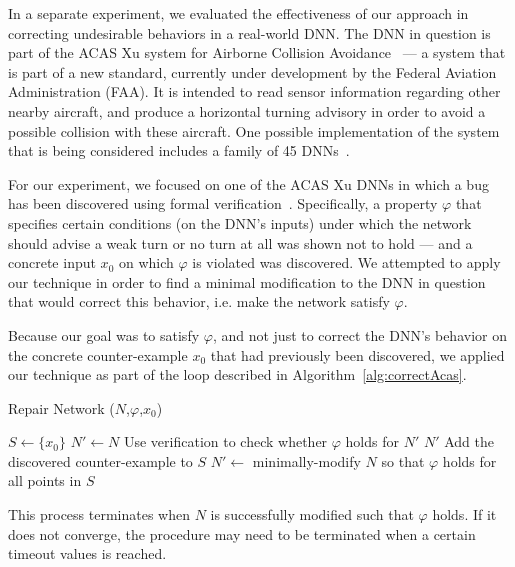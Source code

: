\documentclass{easychair}
\begin{document}
In a separate experiment, we evaluated the effectiveness of our
approach in correcting undesirable behaviors in a real-world DNN. The
DNN in question is part of the ACAS Xu system for Airborne Collision
Avoidance~\cite{JuLoBrOwKo16} --- a system that is part of a new
standard, currently under development by the Federal Aviation
Administration (FAA). It is intended to
read sensor information regarding other nearby aircraft, and produce a
horizontal turning advisory in order to avoid a possible collision
with these aircraft. One possible implementation of the system that is
being considered includes a family of 45 DNNs~\cite{JuLoBrOwKo16}.

For our experiment, we focused on one of the ACAS Xu DNNs in which a
bug has been discovered using formal
verification~\cite{KaBaDiJuKo17Reluplex}. Specifically, a property
$\varphi$ that specifies certain conditions (on the DNN's inputs)
under which the network should advise a weak turn or no turn at all
was shown not to hold --- and a concrete input $x_0$ on which $\varphi$ is
violated was discovered. We attempted to apply our
technique in order to find a minimal modification to the DNN in question that
would correct this behavior, i.e. make the network satisfy $\varphi$.

Because our goal was to satisfy $\varphi$, and not just to correct the
DNN's behavior on the concrete counter-example $x_0$ that had previously
been discovered, we applied our technique as part of the loop
described in Algorithm~\ref{alg:correctAcas}.

\begin{algorithm}
\caption{Repair Network ($N$,$\varphi$,$x_0$)}
\begin{algorithmic}[1]
  \State $S\leftarrow \{x_0\}$
  \State $N'\leftarrow N$
  \State Use verification to check whether $\varphi$ holds for $N'$
    \State\Return $N'$
  \Else
    \State Add the discovered counter-example to $S$
    \State $N'\leftarrow$ minimally-modify $N$ so that $\varphi$
    holds for all points in $S$
    \EndIf
    \EndWhile
\end{algorithmic}
\label{alg:correctAcas}
\end{algorithm}

This process terminates when $N$ is successfully modified such
that $\varphi$ holds. If it does not converge, the procedure may need
to be terminated when a certain timeout values is reached.
\end{document}
